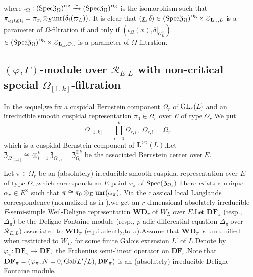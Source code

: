 \documentclass[SecEq,CM,GP]{degruyter-crelle} %
\theoremstyle{plain}
\newcommand{\df}{{\mathbf{DF}}}
\newcommand{\gal}{{\rm Gal}}
\newcommand{\GLN}{{\rm GL}}
\newcommand{\lrr}{{\langle r\rangle}}
\newcommand{\omepik}{\Omega_{[1,k]}}
\newcommand{\rigerch}{{\mathcal{Z}_{\bL_{\ul{n}},\mathcal{O}_L}}}
\newcommand{\rigerchl}{{\mathcal{Z}_{\bL_{\ul{n}},L}}}
\newcommand{\Spec}{\rm Spec}
\newcommand{\sban}{{\left(\Spec\mathfrak{Z}_{\Omega}\right)^{\mathrm{rig}}}}
\newcommand{\te}{{\otimes_E}}
\newcommand{\unr}{{\rm unr}}
\newcommand{\ul}{\underline}
\newcommand{\wdre}{{\textbf{WD}}}
\newcommand{\bL}{{\mathbf{L}}}
\newcommand{\cR}{\mathcal R}
\newcommand{\cF}{\mathcal F}
\newcommand{\FZ}{{\mathfrak{Z}}}
\begin{document}
where $\iota_{\Omega}:\sban\xrightarrow{\sim}\sban$ is the isomorphism such that
$\pi_{\iota_{\Omega}(\underline{x})_i}=\pi_{x_i}\te \unr(\delta_i(\varpi_L))$. It is clear that $(\underline{x},\delta)\in\sban\times\rigerchl $ is a  parameter of $\Omega$-filtration if and only if $(\iota_{\Omega}(\underline{x}),\delta|_{\mathcal{O}_L^\times})$\\$\in\sban\times\rigerch$ is a parameter of $\Omega$-filtration.\;

\subsection{\texorpdfstring{$(\varphi,\Gamma)$-module  over $\cR_{E,L}$ with non-critical special $\omepik$-filtration}{Lg}}\label{noncrispecfildfn}

In the sequel,\;we fix a cuspidal Bernstein component $\Omega_r$ of $\GLN_r(L)$ and an irreducible smooth cuspidal representation $\pi_{0}\in \Omega_r$ over $E$ of type $ \Omega_r$.\;We put
\[\omepik=\prod_{i=1}^k\Omega_{r,i},\;\Omega_{r,i}=\Omega_{r}\]
which is a cuspidal Bernstein component of $\bL^{\lrr}(L)$.\;Let $\FZ_{\omepik}\cong\otimes_{i=1}^k\FZ_{\Omega_{r,i}}=\FZ_{\Omega_{r}}^{\otimes k}$ be the associated 
Bernstein center over $E$.\;

Let $\pi\in \Omega_r$ be an (absolutely) irreducible smooth cuspidal representation over $E$ of type $\Omega_r$,\;which corresponds an $E$-point $x_\pi$ of $\Spec(\FZ_{\Omega_{r}})$.\;There exists a unique $\alpha_\pi \in E^\times$ such that $\pi\cong \pi_0\otimes_E\unr(\alpha_\pi)$. Via the classical local Langlands correspondence (normalized as in \cite{scholze2013local}),\;we get an $r$-dimensional absolutely irreducible $F$-semi-simple Weil-Deligne representation $\wdre_\pi$ of $W_L$ over $E$.\;Let $\df_\pi$ (resp.,\; ${\Delta_\pi}$) be the Deligne-Fontaine module (resp.,\; $p$-adic differential equation ${\Delta_\pi}$ over $\cR_{E,L}$) associated to $\wdre_\pi$ (equivalently,\;to $\pi$).\;Assume that $\wdre_\pi$ is unramified when restricted to $W_{L'}$ for some finite Galois extension $L'$ of $L$.\;Denote by $\varphi_\pi:\df_\pi\rightarrow \df_\pi$ the Frobenius semi-linear operator  on $\df_\pi$.\;Note that $\df_\pi=(\varphi_\pi,N=0,\gal(L'/L),\df_\pi)$ is an (absolutely) irreducible Deligne-Fontaine module.\;

\end{document}

